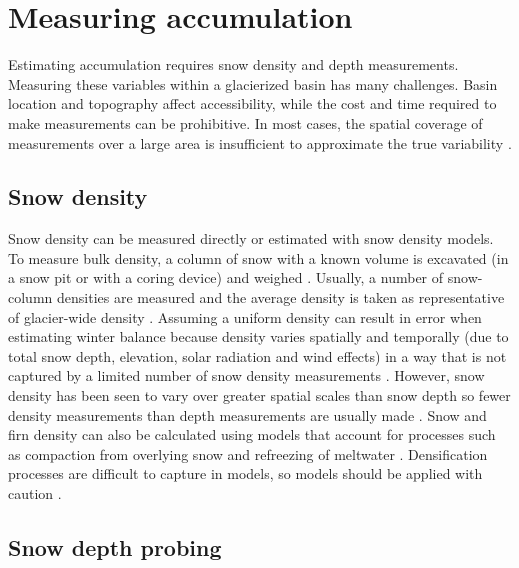 \documentclass{sfuthesis}
\begin{document}
\section{Measuring accumulation}
Estimating accumulation requires snow density and depth measurements. Measuring these variables within a glacierized basin has many challenges. Basin location and topography affect accessibility, while the cost and time required to make measurements can be prohibitive. In most cases, the spatial coverage of measurements over a large area is insufficient to approximate the true variability \citep{Bloeschl1999, Deems2006a}.

\subsection{Snow density}

Snow density can be measured directly or estimated with snow density models. To measure bulk density, a column of snow with a known volume is excavated (in a snow pit or with a coring device) and weighed \citep[e.g.][]{Sold2013, Sold2014}. Usually, a number of snow-column densities are measured and the average density is taken as representative of glacier-wide density \citep[e.g.][]{Machguth2006, Grunewald2010, McGrath2015}. Assuming a uniform density can result in error when estimating winter balance because density varies spatially and temporally (due to total snow depth, elevation, solar radiation and wind effects) in a way that is not captured by a limited number of snow density measurements \citep{Grunewald2010, Wetlaufer2016}. However, snow density has been seen to vary over greater spatial scales than snow depth so fewer density measurements than depth measurements are usually made \citep{Elder1998, Clark2011}. Snow and firn density can also be calculated using models that account for processes such as compaction from overlying snow and refreezing of meltwater \citep{Herron1980, Sold2014}. Densification processes are difficult to capture in models, so models should be applied with caution \citep{Mellor1974}.

\subsection{Snow depth probing}
\end{document}
